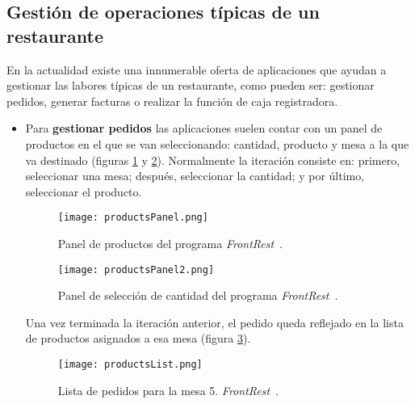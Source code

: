     \subsection{Gestión de operaciones típicas de un restaurante}
    En la actualidad existe una innumerable oferta de aplicaciones que ayudan
    a gestionar las labores típicas de un restaurante, como pueden ser:
    gestionar pedidos, generar facturas o realizar la función de caja 
    registradora.

    \begin{itemize}
    \item Para \textbf{gestionar pedidos} las aplicaciones suelen contar con 
    un panel de productos en el que se van seleccionando: cantidad, producto y 
    mesa a la que va destinado (figuras \ref{fig:productsPanel} y
    \ref{fig:productsPanel2}). Normalmente la iteración consiste en: primero,
    seleccionar una mesa; después, seleccionar la cantidad; y por último,
    seleccionar el producto.

    \begin{figure}[!h]
      \begin{center}
        \texttt{[image: productsPanel.png]}
        \caption{Panel de productos del programa
        \emph{FrontRest}~\cite{bib:frontRest}.}
        \label{fig:productsPanel}
      \end{center}
    \end{figure}

    \begin{figure}[!h]
      \begin{center}
        \texttt{[image: productsPanel2.png]}
        \caption{Panel de selección de cantidad del programa
        \emph{FrontRest}~\cite{bib:frontRest}.}
        \label{fig:productsPanel2}
      \end{center}
    \end{figure}

    Una vez terminada la iteración anterior, el pedido queda reflejado en la
    lista de productos asignados a esa mesa (figura \ref{fig:productsList}).

    \begin{figure}[!h]
      \begin{center}
        \texttt{[image: productsList.png]}
        \caption{Lista de pedidos para la mesa 5.
        \emph{FrontRest}~\cite{bib:frontRest}.}
        \label{fig:productsList}
      \end{center}
    \end{figure}


\end{itemize}
